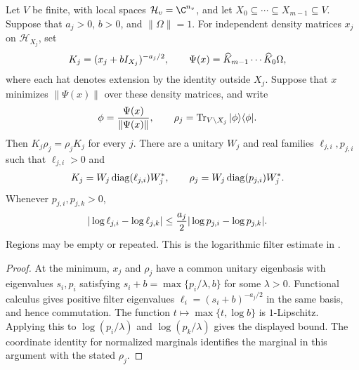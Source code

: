 \begin{lemma}
    \label{lem:peps_actual_patch_minimum_filter_clipping}
    Let $V$ be finite, with local spaces $\mathcal H_v=\C^{n_v}$, and let
    $X_0\subseteq\cdots\subseteq X_{m-1}\subseteq V$.
    Suppose that $a_j>0$, $b>0$, and $\|\Omega\|=1$.
    For independent density matrices $x_j$ on $\mathcal H_{X_j}$, set
    \begin{align}
         & K_j=(x_j+bI_{X_j})^{-a_j/2},\qquad
        \Psi(x)=\widehat K_{m-1}\cdots\widehat K_0\Omega, \notag
    \end{align}
    where each hat denotes extension by the identity outside $X_j$.
    Suppose that $x$ minimizes $\|\Psi(x)\|$ over these density matrices,
    and write
    \begin{align}
         & \phi=\frac{\Psi(x)}{\|\Psi(x)\|},\qquad
        \rho_j=\operatorname{Tr}_{V\setminus X_j}|\phi\rangle\langle\phi|. \notag
    \end{align}
    Then $K_j\rho_j=\rho_jK_j$ for every $j$. There are a unitary $W_j$
    and real families $\ell_{j,i},p_{j,i}$ such that $\ell_{j,i}>0$ and
    \begin{align}
         & K_j=W_j\operatorname{diag}(\ell_{j,i})W_j^*,\qquad
        \rho_j=W_j\operatorname{diag}(p_{j,i})W_j^*. \notag
    \end{align}
    Whenever $p_{j,i},p_{j,k}>0$,
    \begin{align}
         & |\log\ell_{j,i}-\log\ell_{j,k}|
        \leq\frac{a_j}{2}|\log p_{j,i}-\log p_{j,k}|. \notag
    \end{align}
    Regions may be empty or repeated. This is the logarithmic filter
    estimate in \cite[Proposition~4.1]{OpenAI2026PolynomialPEPS}.
\end{lemma}
\begin{proof}
    At the minimum, $x_j$ and $\rho_j$ have a common unitary eigenbasis
    with eigenvalues $s_i,p_i$ satisfying
    $s_i+b=\max\{p_i/\lambda,b\}$ for some $\lambda>0$.
    Functional calculus gives positive filter eigenvalues
    $\ell_i=(s_i+b)^{-a_j/2}$ in the same basis, and hence commutation.
    The function $t\mapsto\max\{t,\log b\}$ is $1$-Lipschitz.
    Applying this to $\log(p_i/\lambda)$ and $\log(p_k/\lambda)$ gives
    the displayed bound. The coordinate identity for normalized marginals
    identifies the marginal in this argument with the stated $\rho_j$.
\end{proof}
